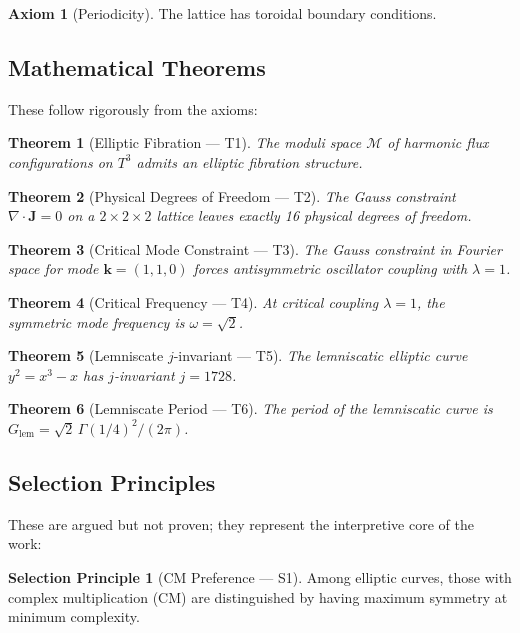 \documentclass[11pt,a4paper]{article}
\newtheorem{theorem}{Theorem}[section]
\theoremstyle{definition}
\newtheorem{axiom}{Axiom}
\newtheorem{selectionprinciple}{Selection Principle}
\theoremstyle{remark}
\newcommand{\Glem}{G_{\text{lem}}}
\begin{document}
\begin{axiom}[Periodicity]
The lattice has toroidal boundary conditions.
\end{axiom}

\subsection{Mathematical Theorems}

These follow rigorously from the axioms:

\begin{theorem}[Elliptic Fibration --- T1]
The moduli space $\mathcal{M}$ of harmonic flux configurations on $T^3$ admits an elliptic fibration structure.
\end{theorem}

\begin{theorem}[Physical Degrees of Freedom --- T2]
The Gauss constraint $\nabla \cdot \mathbf{J} = 0$ on a $2\times2\times2$ lattice leaves exactly 16 physical degrees of freedom.
\end{theorem}

\begin{theorem}[Critical Mode Constraint --- T3]
The Gauss constraint in Fourier space for mode $\mathbf{k} = (1,1,0)$ forces antisymmetric oscillator coupling with $\lambda = 1$.
\end{theorem}

\begin{theorem}[Critical Frequency --- T4]
At critical coupling $\lambda = 1$, the symmetric mode frequency is $\omega = \sqrt{2}$.
\end{theorem}

\begin{theorem}[Lemniscate $j$-invariant --- T5]
The lemniscatic elliptic curve $y^2 = x^3 - x$ has $j$-invariant $j = 1728$.
\end{theorem}

\begin{theorem}[Lemniscate Period --- T6]
The period of the lemniscatic curve is $\Glem = \sqrt{2}\,\Gamma(1/4)^2/(2\pi)$.
\end{theorem}

\subsection{Selection Principles}

These are argued but not proven; they represent the interpretive core of the work:

\begin{selectionprinciple}[CM Preference --- S1]
Among elliptic curves, those with complex multiplication (CM) are distinguished by having maximum symmetry at minimum complexity.
\end{selectionprinciple}
\end{document}
